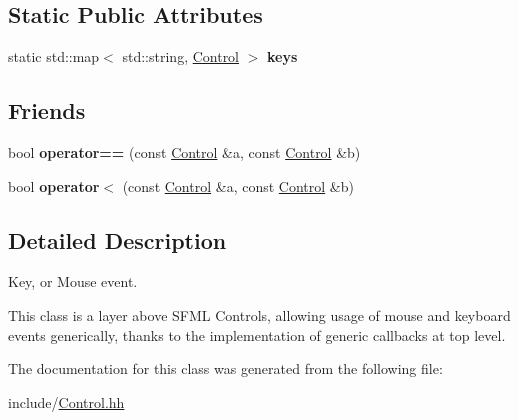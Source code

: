 \subsection*{Static Public Attributes}
\begin{DoxyCompactItemize}
\item 
static std\+::map$<$ std\+::string, \hyperlink{classControl}{Control} $>$ {\bfseries keys}\hypertarget{classControl_a7688105cfe0c914511b1b4fb0e349984}{}\label{classControl_a7688105cfe0c914511b1b4fb0e349984}

\end{DoxyCompactItemize}
\subsection*{Friends}
\begin{DoxyCompactItemize}
\item 
bool {\bfseries operator==} (const \hyperlink{classControl}{Control} \&a, const \hyperlink{classControl}{Control} \&b)\hypertarget{classControl_a8f2855510a7bf0d1dfdf52351cc33087}{}\label{classControl_a8f2855510a7bf0d1dfdf52351cc33087}

\item 
bool {\bfseries operator$<$} (const \hyperlink{classControl}{Control} \&a, const \hyperlink{classControl}{Control} \&b)\hypertarget{classControl_aa607f41e48fdeaa5bcfe905f3fda5125}{}\label{classControl_aa607f41e48fdeaa5bcfe905f3fda5125}

\end{DoxyCompactItemize}


\subsection{Detailed Description}
Key, or Mouse event. 

This class is a layer above S\+F\+ML Controls, allowing usage of mouse and keyboard events generically, thanks to the implementation of generic callbacks at top level. 

The documentation for this class was generated from the following file\+:\begin{DoxyCompactItemize}
\item 
include/\hyperlink{Control_8hh}{Control.\+hh}\end{DoxyCompactItemize}
